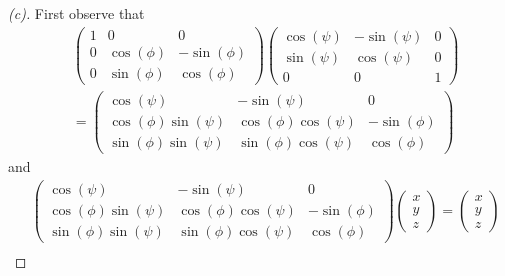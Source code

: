 \begin{proof}[(c)]
  First observe that
  \begin{align*}
     & \begin{pmatrix}
         1 & 0          & 0           \\
         0 & \cos(\phi) & -\sin(\phi) \\
         0 & \sin(\phi) & \cos(\phi)
       \end{pmatrix} \begin{pmatrix}
                       \cos(\psi) & -\sin(\psi) & 0 \\
                       \sin(\psi) & \cos(\psi)  & 0 \\
                       0          & 0           & 1
                     \end{pmatrix}                    \\
     & = \begin{pmatrix}
           \cos(\psi)            & -\sin(\psi)           & 0           \\
           \cos(\phi) \sin(\psi) & \cos(\phi) \cos(\psi) & -\sin(\phi) \\
           \sin(\phi) \sin(\psi) & \sin(\phi) \cos(\psi) & \cos(\phi)
         \end{pmatrix}
  \end{align*}
  and
  \begin{align*}
             & \begin{pmatrix}
                 \cos(\psi)            & -\sin(\psi)           & 0           \\
                 \cos(\phi) \sin(\psi) & \cos(\phi) \cos(\psi) & -\sin(\phi) \\
                 \sin(\phi) \sin(\psi) & \sin(\phi) \cos(\psi) & \cos(\phi)
               \end{pmatrix} \begin{pmatrix}
                               x \\
                               y \\
                               z
                             \end{pmatrix} = \begin{pmatrix}
                                               x \\
                                               y \\
                                               z
                                             \end{pmatrix}            \\

\end{align*}
\end{proof}
